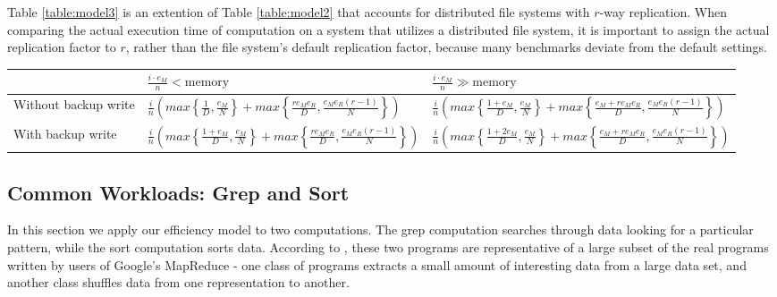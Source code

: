\documentclass{acm_proc_article-sp}
\begin{document}
Table \ref{table:model3} is an extention of Table \ref{table:model2} that accounts for distributed file systems with $r$-way replication. When comparing the actual execution time of computation on a system that utilizes a distributed file system, it is important to assign the actual replication factor to $r$, rather than the file system's default replication factor, because many benchmarks deviate from the default settings.  

\begin{table*}
\centering
\renewcommand{\arraystretch}{1.2}
\begin{tabular}{|l|l|l|}
\hline
& $\frac{i \cdot e_M}{n}< \text{memory}$ & $\frac{i \cdot e_M}{n} \gg \text{memory}$ \\ \hline
Without backup write &
$\frac{i}{n} \left( max\left\{\frac{1}{D}, \frac{e_M}{N}\right\} + max\left\{\frac{r e_M e_R}{D}, \frac{e_M e_R \left(r - 1\right)}{N}\right\} \right)$ &
$\frac{i}{n} \left( max\left\{\frac{1 + e_M}{D}, \frac{e_M}{N}\right\} + max\left\{\frac{e_M + r e_M e_R}{D}, \frac{e_M e_R \left(r - 1\right)}{N}\right\} \right)$ \\ \hline
With backup write &
$\frac{i}{n} \left( max\left\{\frac{1 + e_M}{D}, \frac{e_M}{N}\right\} + max\left\{\frac{r e_M e_R}{D}, \frac{e_M e_R \left(r - 1\right)}{N}\right\} \right)$ &
$\frac{i}{n} \left( max\left\{\frac{1 + 2 e_M}{D}, \frac{e_M}{N}\right\} + max\left\{\frac{e_M + r e_M e_R}{D}, \frac{e_M e_R \left(r - 1\right)}{N}\right\} \right)$ \\ \hline
\end{tabular}
\caption{The execution time of a map-reduce computation on a parallel dataflow system in which output data is replicated accross $r$ nodes.}
\label{table:model3}
\end{table*}

\subsection{Common Workloads: Grep and Sort}

In this section we apply our efficiency model to two computations. The grep computation searches through data looking for a particular pattern, while the sort computation sorts data. According to \cite{mapreduce}, these two programs are representative of a large subset of the real programs written by users of Google's MapReduce - one class of programs extracts a small amount of interesting data from a large data set, and another class shuffles data from one representation to another.
\end{document}
